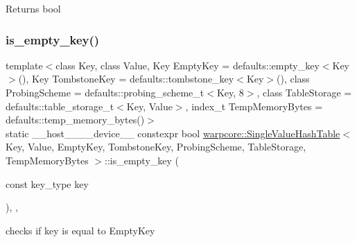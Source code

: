 \begin{DoxyReturn}{Returns}
{\ttfamily bool} 
\end{DoxyReturn}
\mbox{\label{classwarpcore_1_1SingleValueHashTable_af74c58b98cbc197243f98940ee0b1baa}} 
\subsubsection{\texorpdfstring{is\+\_\+empty\+\_\+key()}{is\_empty\_key()}}
{\footnotesize\ttfamily template$<$class Key, class Value, Key Empty\+Key = defaults\+::empty\+\_\+key$<$\+Key$>$(), Key Tombstone\+Key = defaults\+::tombstone\+\_\+key$<$\+Key$>$(), class Probing\+Scheme = defaults\+::probing\+\_\+scheme\+\_\+t$<$\+Key, 8$>$, class Table\+Storage = defaults\+::table\+\_\+storage\+\_\+t$<$\+Key, Value$>$, index\+\_\+t Temp\+Memory\+Bytes = defaults\+::temp\+\_\+memory\+\_\+bytes()$>$ \\
static \+\_\+\+\_\+host\+\_\+\+\_\+\+\_\+\+\_\+device\+\_\+\+\_\+ constexpr bool \hyperlink{classwarpcore_1_1SingleValueHashTable}{warpcore\+::\+Single\+Value\+Hash\+Table}$<$ Key, Value, Empty\+Key, Tombstone\+Key, Probing\+Scheme, Table\+Storage, Temp\+Memory\+Bytes $>$\+::is\+\_\+empty\+\_\+key (\begin{DoxyParamCaption}\item[{const key\+\_\+type}]{key }\end{DoxyParamCaption})\hspace{0.3cm}{\ttfamily [inline]}, {\ttfamily [static]}, {\ttfamily [noexcept]}}



checks if {\ttfamily key} is equal to {\ttfamily Empty\+Key} 

